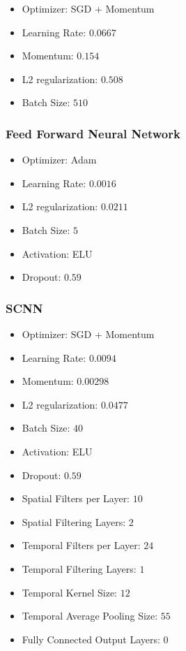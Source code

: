 \begin{itemize}
\item Optimizer: SGD + Momentum
\item Learning Rate: $0.0667$
\item Momentum: $0.154$
\item L2 regularization: $0.508$
\item Batch Size: $510$
\end{itemize}

\subsubsection{Feed Forward Neural Network}

\begin{itemize}
\item Optimizer: Adam
\item Learning Rate: $0.0016$
\item L2 regularization: $0.0211$
\item Batch Size: $5$
\item Activation: ELU
\item Dropout: $0.59$
\end{itemize}

\subsubsection{SCNN}

\begin{itemize}
\item Optimizer: SGD + Momentum
\item Learning Rate: $0.0094$
\item Momentum: $0.00298$
\item L2 regularization: $0.0477$
\item Batch Size: $40$
\item Activation: ELU
\item Dropout: $0.59$
\item Spatial Filters per Layer: $10$
\item Spatial Filtering Layers: $2$
\item Temporal Filters per Layer: $24$
\item Temporal Filtering Layers: $1$
\item Temporal Kernel Size: $12$
\item Temporal Average Pooling Size: $55$
\item Fully Connected Output Layers: $0$
\end{itemize}

